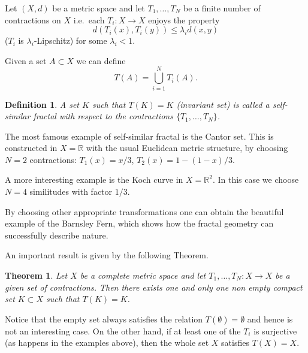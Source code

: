 \documentclass[12pt]{article}
\newcommand{\R}{\mathbb R}
\newtheorem{theorem}{Theorem}
\newtheorem{definition}{Definition}
\theoremstyle{remark}
\begin{document}
Let $(X,d)$ be a metric space and let $T_1,\ldots,T_N$ be a finite number of contractions on $X$ i.e.\ each $T_i\colon X\to X$ enjoys the property
\[
  d(T_i(x),T_i(y)) \le \lambda_i d(x,y)
\]
($T_i$ is $\lambda_i$-Lipschitz) for some $\lambda_i<1$.

Given a set $A\subset X$ we can define
\[
  T(A) = \bigcup_{i=1}^N T_i(A).
\]

\begin{definition}
A set $K$ such that $T(K)=K$ (invariant set) is called a \emph{self-similar fractal} with respect to the contractions $\{T_1,\ldots,T_N\}$.
\end{definition}

The most famous example of self-similar fractal is the Cantor set.
This is constructed in $X=\R$ with the usual Euclidean metric structure, by
choosing $N=2$ contractions: $T_1(x)=x/3$, $T_2(x)=1-(1-x)/3$. 

A more interesting example is the Koch curve in $X=\R^2$. In this case we choose 
$N=4$ similitudes with factor $1/3$.

By choosing other appropriate transformations one can obtain the beautiful example of the Barnsley Fern, which shows how the fractal geometry can successfully describe nature.

An important result is given by the following Theorem.
\begin{theorem}
Let $X$ be a complete metric space and let
$T_1,\ldots, T_N\colon X \to X$ be a given set of contractions. 
Then there exists one and only one non empty compact set $K\subset X$ such that 
$T(K)=K$.
\end{theorem}

Notice that the empty set always satisfies the relation $T(\emptyset)=\emptyset$ 
and hence is not an interesting case. On the other hand, if at least one of the $T_i$ is surjective (as happens in the examples above), then the whole set $X$ 
satisfies $T(X)=X$.


\end{document}
